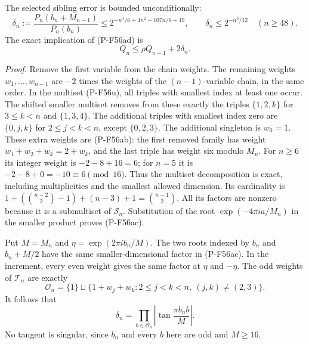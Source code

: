 \documentclass[11pt,a4paper]{article}
\begin{document}
The selected sibling error is bounded unconditionally:
\[
 \delta_n:=
 \frac{P_n(b_n+M_{n-1})}{P_n(b_n)}
 \le
 2^{-n^3/6+4n^2-107n/6+19},
 \qquad
 \delta_n\le2^{-n^3/12}\quad(n\ge48).
 \tag{P-F56ae}
\]
The exact implication of (P-F56ad) is
\[
                         Q_n\le\rho Q_{n-1}+2\delta_n.
 \tag{P-F56af}
\]

\emph{Proof.}
Remove the first variable from the chain weights.
The remaining weights $w_1,\ldots,w_{n-1}$ are $-2$
times the weights of the $(n-1)$-variable chain, in the
same order. In the multiset (P-F56u), all triples with
smallest index at least one occur. The shifted smaller
multiset removes from these exactly the triples
$\{1,2,k\}$ for $3\le k<n$ and $\{1,3,4\}$.
The additional triples with smallest index zero are
$\{0,j,k\}$ for $2\le j<k<n$, except $\{0,2,3\}$.
The additional singleton is $w_0=1$.
These extra weights are (P-F56ab): the first removed
family has weight $w_1+w_2+w_k=2+w_k$, and the last
triple has weight six modulo $M_n$.
For $n\ge6$ its integer weight is $-2-8+16=6$;
for $n=5$ it is $-2-8+0=-10\equiv6\pmod {16}$.
Thus the multiset decomposition is exact, including
multiplicities and the smallest allowed dimension.
Its cardinality is
$1+(\binom{n-2}2-1)+(n-3)+1=\binom{n-1}2$.
All its factors are nonzero because it is a submultiset
of $\mathcal S_n$. Substitution of the root
$\exp(-4\pi ia/M_n)$ in the smaller product proves
(P-F56ac).

Put $M=M_n$ and $\eta=\exp(2\pi ib_n/M)$.
The two roots indexed by $b_n$ and $b_n+M/2$
have the same smaller-dimensional factor in (P-F56ac).
In the increment, every even weight gives the same
factor at $\eta$ and $-\eta$.
The odd weights of $\mathcal T_n$ are exactly
\[
 \mathcal O_n=
 \{1\}\sqcup
 \{1+w_j+w_k:2\le j<k<n,\ (j,k)\ne(2,3)\}.
 \]
It follows that
\[
                 \delta_n
       =\prod_{b\in\mathcal O_n}
                     \left|\tan\frac{\pi b_n b}{M}\right|.
 \tag{P-F56ag}
\]
No tangent is singular, since $b_n$ and every $b$ here
are odd and $M\ge16$.
\end{document}
